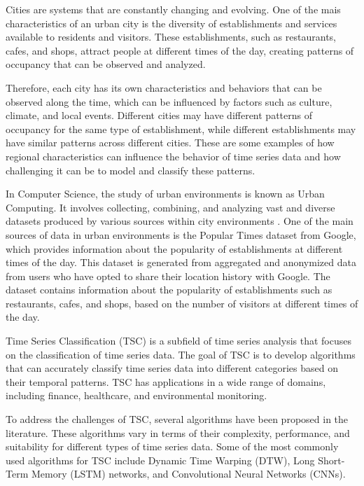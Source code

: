 \documentclass{ieeeaccess}
\begin{document}
Cities are systems that are constantly changing and evolving. One of the mais characteristics of an urban city is the diversity of establishments and services available to residents and visitors. These establishments, such as restaurants, cafes, and shops, attract people at different times of the day, creating patterns of occupancy that can be observed and analyzed.

Therefore, each city has its own characteristics and behaviors that can be observed along the time, which can be influenced by factors such as culture, climate, and local events. Different cities may have different patterns of occupancy for the same type of establishment, while different establishments may have similar patterns across different cities. These are some examples of how regional characteristics can influence the behavior of time series data and how challenging it can be to model and classify these patterns.

In Computer Science, the study of urban environments is known as Urban Computing. It involves collecting, combining, and analyzing vast and diverse datasets produced by various sources within city environments \cite{zheng2014urban}.
One of the main sources of data in urban environments is the Popular Times dataset from Google, which provides information about the popularity of establishments at different times of the day. This dataset is generated from aggregated and anonymized data from users who have opted to share their location history with Google. The dataset contains information about the popularity of establishments such as restaurants, cafes, and shops, based on the number of visitors at different times of the day.


Time Series Classification (TSC) is a subfield of time series analysis that focuses on the classification of time series data. The goal of TSC is to develop algorithms that can accurately classify time series data into different categories based on their temporal patterns. TSC has applications in a wide range of domains, including finance, healthcare, and environmental monitoring.

To address the challenges of TSC, several algorithms have been proposed in the literature. These algorithms vary in terms of their complexity, performance, and suitability for different types of time series data. Some of the most commonly used algorithms for TSC include Dynamic Time Warping (DTW), Long Short-Term Memory (LSTM) networks, and Convolutional Neural Networks (CNNs).
\end{document}
